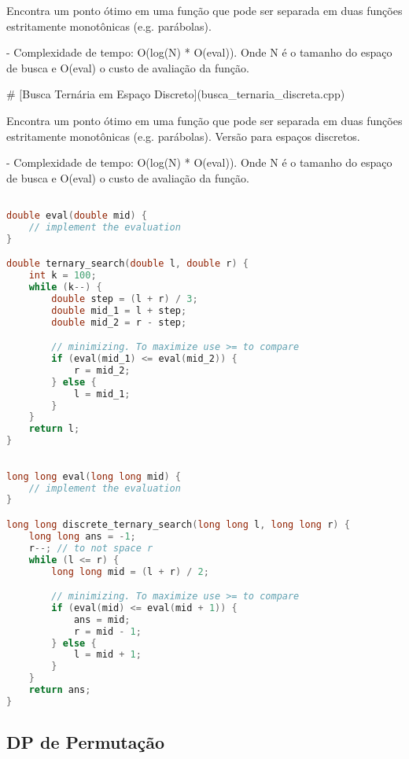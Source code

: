 \documentclass[11pt, a4paper, twoside]{article}
\begin{document}
Encontra um ponto ótimo em uma função que pode ser separada em duas funções estritamente monotônicas (e.g. parábolas).

- Complexidade de tempo: O(log(N) * O(eval)). Onde N é o tamanho do espaço de busca e O(eval) o custo de avaliação da função.

\# [Busca Ternária em Espaço Discreto](busca\_ternaria\_discreta.cpp)

Encontra um ponto ótimo em uma função que pode ser separada em duas funções estritamente monotônicas (e.g. parábolas).
Versão para espaços discretos.

- Complexidade de tempo: O(log(N) * O(eval)). Onde N é o tamanho do espaço de busca e O(eval) o custo de avaliação da função.
\begin{multicols}{2}
\begin{lstlisting}[language=C++]

double eval(double mid) {
    // implement the evaluation
}

double ternary_search(double l, double r) {
    int k = 100;
    while (k--) {
        double step = (l + r) / 3;
        double mid_1 = l + step;
        double mid_2 = r - step;

        // minimizing. To maximize use >= to compare
        if (eval(mid_1) <= eval(mid_2)) {
            r = mid_2;
        } else {
            l = mid_1;
        }
    }
    return l;
}
\end{lstlisting}
\end{multicols}

\begin{lstlisting}[language=C++]

long long eval(long long mid) {
    // implement the evaluation
}

long long discrete_ternary_search(long long l, long long r) {
    long long ans = -1;
    r--; // to not space r
    while (l <= r) {
        long long mid = (l + r) / 2;

        // minimizing. To maximize use >= to compare
        if (eval(mid) <= eval(mid + 1)) {
            ans = mid;
            r = mid - 1;
        } else {
            l = mid + 1;
        }
    }
    return ans;
}
\end{lstlisting}

\subsection{DP de Permutação}
\end{document}
